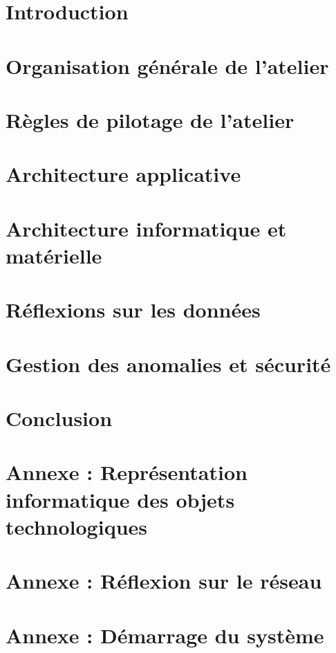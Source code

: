 
\section{Introduction}

\section{Organisation générale de l'atelier}

\section{Règles de pilotage de l'atelier}

\section{Architecture applicative}

\section{Architecture informatique et matérielle}

\section{Réflexions sur les données}

\section{Gestion des anomalies et sécurité}

\section{Conclusion}

\appendix

\section{Annexe : Représentation informatique des objets technologiques}

\section{Annexe : Réflexion sur le réseau}

\section{Annexe : Démarrage du système}
